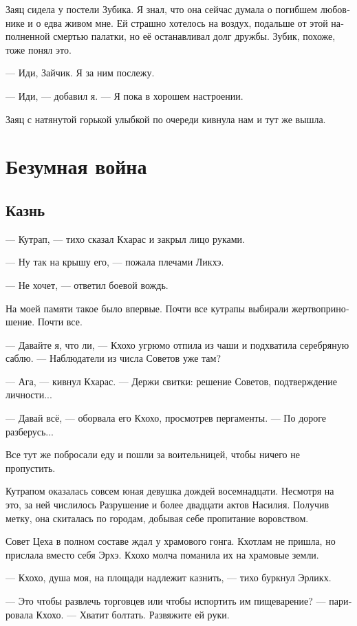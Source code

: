 \documentclass[a4paper,12pt,fleqn]{book}\usepackage{cooltooltips}\usepackage{polyglossia}\setdefaultlanguage[babelshorthands=true]{russian}\setotherlanguage{english}\defaultfontfeatures{Ligatures=TeX,Mapping=tex-text} \usepackage{xcolor}\definecolor{lightgray}{HTML}{bbbbbb}\color{lightgray}\newcommand{\ml}[3]{\textenglish{\textcolor{black}{#3}}}
\begin{document}
{Заяц сидела у постели Зубика.
Я знал, что она сейчас думала о погибшем любовнике и о едва живом мне.
Ей страшно хотелось на воздух, подальше от этой наполненной смертью палатки, но её останавливал долг дружбы.
Зубик, похоже, тоже понял это.

--- Иди, Зайчик.
Я за ним послежу.

--- Иди, --- добавил я.
--- Я пока в хорошем настроении.

Заяц с натянутой горькой улыбкой по очереди кивнула нам и тут же вышла.

\chapter{Безумная война}

\section{Казнь}

--- Кутрап, --- тихо сказал Кхарас и закрыл лицо руками.

--- Ну так на крышу его, --- пожала плечами Ликхэ.

--- Не хочет, --- ответил боевой вождь.

На моей памяти такое было впервые.
Почти все кутрапы выбирали жертвоприношение.
Почти все.

--- Давайте я, что ли, --- Кхохо угрюмо отпила из чаши и подхватила серебряную саблю.
--- Наблюдатели из числа Советов уже там?

--- Ага, --- кивнул Кхарас.
--- Держи свитки: решение Советов, подтверждение личности...

--- Давай всё, --- оборвала его Кхохо, просмотрев пергаменты.
--- По дороге разберусь...

Все тут же побросали еду и пошли за воительницей, чтобы ничего не пропустить.

Кутрапом оказалась совсем юная девушка дождей восемнадцати.
Несмотря на это, за ней числилось Разрушение и более двадцати актов Насилия.
Получив метку, она скиталась по городам, добывая себе пропитание воровством.

Совет Цеха в полном составе ждал у храмового гонга.
Кхотлам не пришла, но прислала вместо себя Эрхэ.
Кхохо молча поманила их на храмовые земли.

--- Кхохо, душа моя, на площади надлежит казнить, --- тихо буркнул Эрликх.

--- Это чтобы развлечь торговцев или чтобы испортить им пищеварение? --- парировала Кхохо.
--- Хватит болтать.
Развяжите ей руки.

}
\end{document}
